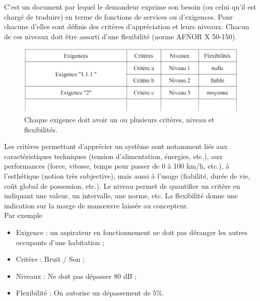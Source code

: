 \documentclass[
	11pt, %
	fleqn, %
	a4paper, %
]{LegrandOrangeBook}
\begin{document}
\begin{definition}
    C’est un document par lequel le demandeur exprime son besoin (ou celui qu'il est chargé de
traduire) en terme de fonctions de services ou d’exigences. Pour chacune d’elles sont définis
des critères d’appréciation et leurs niveaux. Chacun de ces niveaux doit être assorti d’une
flexibilité (norme AFNOR X 50-150).\\
\end{definition}

\begin{figure}[H] %
	\centering %
	\includegraphics[width=1\textwidth]{Images/sys2.JPG} %
	\caption{Chaque exigence doit avoir un ou plusieurs critères, niveau et flexibilités.}
	\label{sys2} %
\end{figure}

Les critères permettant d’apprécier un système sont notamment liés aux caractéristiques
techniques (tension d’alimentation, énergies, etc.), aux performances (force, vitesse, temps pour
passer de 0 à 100 km/h, etc.), à l’esthétique (notion très subjective), mais aussi à l’usage
(fiabilité, durée de vie, coût global de possession, etc.).
Le niveau permet de quantifier un critère en indiquant une valeur, un intervalle, une norme, etc.
La flexibilité donne une indication sur la marge de manœuvre laissée au concepteur.\\


Par exemple
\begin{itemize}
    \item Exigence : un aspirateur en fonctionnement ne doit pas déranger les autres occupants d'une habitation ;
    \item Critère : Bruit / Son ;
    \item Niveaux : Ne doit pas dépasser 80 dB ;
    \item Flexibilité : On autorise un dépassement de $5\%$.\\
\end{itemize}
\end{document}
